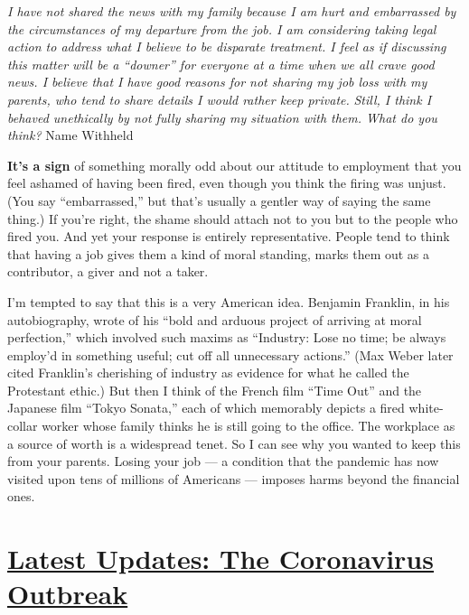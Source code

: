 \emph{I have not shared the news with my family because I am hurt and
embarrassed by the circumstances of my departure from the job. I am
considering taking legal action to address what I believe to be
disparate treatment. I feel as if discussing this matter will be a
``downer'' for everyone at a time when we all crave good news. I believe
that I have good reasons for not sharing my job loss with my parents,
who tend to share details I would rather keep private.} \emph{Still, I
think I behaved unethically by not fully sharing my situation with them.
What do you think?} Name Withheld

\textbf{It's a sign} of something morally odd about our attitude to
employment that you feel ashamed of having been fired, even though you
think the firing was unjust. (You say ``embarrassed,'' but that's
usually a gentler way of saying the same thing.) If you're right, the
shame should attach not to you but to the people who fired you. And yet
your response is entirely representative. People tend to think that
having a job gives them a kind of moral standing, marks them out as a
contributor, a giver and not a taker.

I'm tempted to say that this is a very American idea. Benjamin Franklin,
in his autobiography, wrote of his ``bold and arduous project of
arriving at moral perfection,'' which involved such maxims as
``Industry: Lose no time; be always employ'd in something useful; cut
off all unnecessary actions.'' (Max Weber later cited Franklin's
cherishing of industry as evidence for what he called the Protestant
ethic.) But then I think of the French film ``Time Out'' and the
Japanese film ``Tokyo Sonata,'' each of which memorably depicts a fired
white-collar worker whose family thinks he is still going to the office.
The workplace as a source of worth is a widespread tenet. So I can see
why you wanted to keep this from your parents. Losing your job --- a
condition that the pandemic has now visited upon tens of millions of
Americans --- imposes harms beyond the financial ones.

\hypertarget{latest-updates-the-coronavirus-outbreak}{%
\section{\texorpdfstring{\href{https://www.nytimes.com/2020/08/07/world/covid-19-news.html?action=click\&pgtype=Article\&state=default\&region=MAIN_CONTENT_1\&context=storylines_live_updates}{Latest
Updates: The Coronavirus
Outbreak}}{Latest Updates: The Coronavirus Outbreak}}\label{latest-updates-the-coronavirus-outbreak}}

